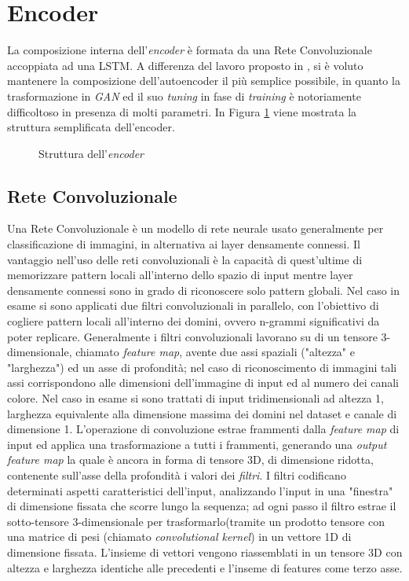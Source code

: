 \section{Encoder}
La composizione interna dell'\textit{encoder} è formata da una Rete Convoluzionale accoppiata ad una LSTM. A differenza del lavoro proposto in \cite{deepdga}, si è voluto mantenere la composizione dell'autoencoder il più semplice possibile, in quanto la trasformazione in \textit{GAN} ed il suo \textit{tuning} in fase di \textit{training} è notoriamente difficoltoso in presenza di molti parametri. In Figura \ref{fig:encoder} viene mostrata la struttura semplificata dell'encoder.

\begin{figure}[!htb]
    \centering
	
	\caption{Struttura dell'\textit{encoder}}
\label{fig:encoder}
\end{figure}

\subsection{Rete Convoluzionale}
Una Rete Convoluzionale è un modello di rete neurale usato generalmente per classificazione di immagini, in alternativa ai layer densamente connessi. Il vantaggio nell'uso delle reti convoluzionali è la capacità di quest'ultime di memorizzare pattern locali all'interno dello spazio di input mentre layer densamente connessi sono in grado di riconoscere solo pattern globali. Nel caso in esame si sono applicati due filtri convoluzionali in parallelo, con l'obiettivo di cogliere pattern locali all'interno dei domini, ovvero n-grammi significativi da poter replicare. Generalmente i filtri convoluzionali lavorano su di un tensore 3-dimensionale, chiamato \textit{feature map}, avente due assi spaziali ("altezza" e "larghezza") ed un asse di profondità; nel caso di riconoscimento di immagini tali assi corrispondono alle dimensioni dell'immagine di input ed al numero dei canali colore. Nel caso in esame si sono trattati di input tridimensionali ad altezza 1, larghezza equivalente alla dimensione massima dei domini nel dataset e canale di dimensione 1. L'operazione di convoluzione estrae frammenti dalla \textit{feature map} di input ed applica una trasformazione a tutti i frammenti, generando una \textit{output feature map} la quale è ancora in forma di tensore 3D, di dimensione ridotta, contenente sull'asse della profondità i valori dei \textit{filtri}. I filtri codificano determinati aspetti caratteristici dell'input, analizzando l'input in una "finestra" di dimensione fissata che scorre lungo la sequenza; ad ogni passo il filtro estrae il sotto-tensore 3-dimensionale per trasformarlo(tramite un prodotto tensore con una matrice di pesi (chiamato \textit{convolutional kernel}) in un vettore 1D di dimensione fissata. L'insieme di vettori vengono riassemblati in un tensore 3D con altezza e larghezza identiche alle precedenti e l'inseme di features come terzo asse.

